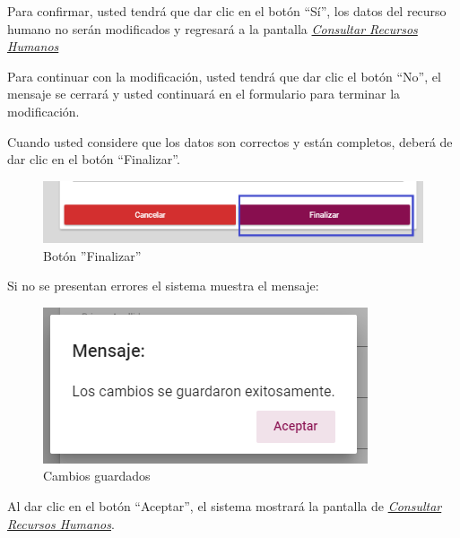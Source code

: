                 Para confirmar, usted tendrá que dar clic en el botón “Sí”, los datos del recurso humano no serán modificados  y regresará a la pantalla \hyperlink{consultarRH}{\textit{Consultar Recursos Humanos}}

                Para continuar con la modificación, usted tendrá que  dar clic el botón “No”, el mensaje se cerrará y usted continuará en el formulario para terminar la modificación.

                Cuando usted considere que los datos son correctos y están completos, deberá de dar clic en el botón “Finalizar”.
                \begin{figure}[H]
                    \centering
                    \hypertarget{btnfin}{\includegraphics[width=0.7\linewidth]{images/SP1/BtnFinalizar}}
                    \caption{Botón ''Finalizar''}
                    \label{btnfin}
                \end{figure}

                Si no se presentan errores el sistema muestra el mensaje:

                 \begin{figure}[H]
                    \centering
                    \includegraphics[width=0.4\linewidth]{images/SP1/MSG31}
                    \caption{Cambios guardados}
                    \label{mensaje31}

                \end{figure}

                Al dar clic en el botón “Aceptar”, el sistema mostrará la pantalla de \hyperlink{consultarRH}{\textit{Consultar Recursos Humanos}}.

